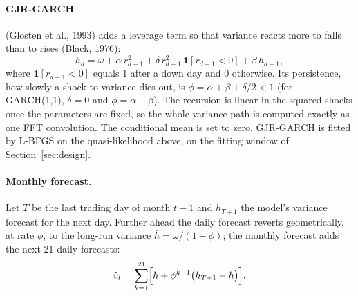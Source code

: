 \documentclass[12pt]{article}
\begin{document}
\paragraph{GJR-GARCH} (Glosten et al., 1993) adds a leverage term so that variance reacts more to falls than to rises (Black, 1976):
\begin{equation}
h_d=\omega+\alpha\, r_{d-1}^2+\delta\, r_{d-1}^2\,\mathbf 1[r_{d-1}<0]+\beta\, h_{d-1},
\end{equation}
where $\mathbf 1[r_{d-1}<0]$ equals 1 after a down day and 0 otherwise. Its persistence, how slowly a shock to variance dies out, is $\phi=\alpha+\beta+\delta/2<1$ (for GARCH(1,1), $\delta=0$ and $\phi=\alpha+\beta$). The recursion is linear in the squared shocks once the parameters are fixed, so the whole variance path is computed exactly as one FFT convolution. The conditional mean is set to zero. GJR-GARCH is fitted by L-BFGS on the quasi-likelihood above, on the fitting window of Section~\ref{sec:design}.

\paragraph{Monthly forecast.} Let $T$ be the last trading day of month $t-1$ and $h_{T+1}$ the model's variance forecast for the next day. Further ahead the daily forecast reverts geometrically, at rate $\phi$, to the long-run variance $\bar h=\omega/(1-\phi)$; the monthly forecast adds the next 21 daily forecasts:
\begin{equation}\label{eq:monthly}
\hat v_t=\sum_{k=1}^{21}\Bigl[\bar h+\phi^{k-1}\bigl(h_{T+1}-\bar h\bigr)\Bigr].
\end{equation}
\end{document}
